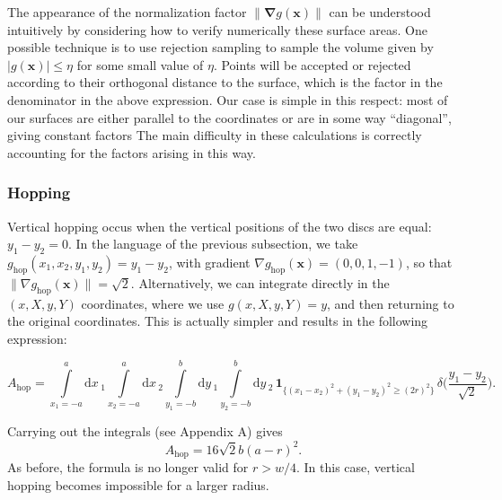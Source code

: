 \documentclass[superscriptaddress,pre,reprint,showpacs,twocolumn]{revtex4-1}
\newcommand{\rd}[1]{\mathrm{d}{#1} \,}
\newcommand{\indicatorsymbol}{\mathbf{1}}
\newcommand{\indicator}[1]{\indicatorsymbol_{ \{   #1 \} } }
\begin{document}
The appearance of the normalization factor $\| \mathbf{\nabla}g(\mathbf{x}) \|$ can be understood intuitively by considering how to verify numerically these surface areas. One possible technique is to use rejection sampling to sample the volume given by $|g(\mathbf{x})| \le \eta$ for some small value of $\eta$. Points will be accepted or rejected according to their orthogonal distance to the surface, which is the factor in the denominator in the above expression. Our case is simple in this respect: most of our surfaces are either parallel to the coordinates or are in some way ``diagonal'', giving constant factors
The main difficulty in these calculations is correctly accounting for the factors arising in this way.


\subsubsection{Hopping}

Vertical hopping occus when the vertical positions of the two discs are equal: $y_1 - y_2=0$. In the language of the previous subsection, we take
 $g_\mathrm{hop}(x_1, x_2, y_1, y_2)= y_1 - y_2$, with gradient  $\nabla g_\mathrm{hop}(\mathbf{x}) = (0, 0, 1, -1)$, so that $ \| \nabla g_\mathrm{hop}(\mathbf{x}) \| = \sqrt{2}$. 
 Alternatively, we can integrate 
directly in the $(x,X,y,Y)$ coordinates, where we use
$g(x,X,y,Y) = y$, and then returning to the original coordinates. This is actually
simpler and results in the following expression:
\begin{widetext}
\begin{equation}
 A_\text{hop} = \int\limits_{x_1 = -a}^a \rd x_1 \int\limits_{x_2 = -a}^a \rd x_2 
\int\limits_{y_1 = -b}^b \rd y_1 \int\limits_{y_2 = -b}^b \rd y_2 \, \indicator{ (x_1-x_2)^2 + (y_1-y_2)^2 \ge (2r)^2 } \, \delta \big(\frac{y_1-y_2}{\sqrt{2}}\big).
\end{equation}
\end{widetext}
Carrying out the integrals  (see Appendix A) gives
 \begin{equation}\label{AreaH}
 A_\text{hop}  =  16 \sqrt{2} b(a-r)^2.
\end{equation}
As before, the formula is no longer valid for $r > w/4$. In this case,
vertical hopping becomes impossible for a larger radius.
\end{document}
